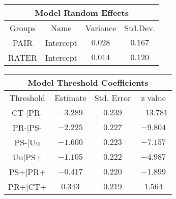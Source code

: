 \begin{minipage}{\linewidth}
\begin{tabular}{|c|c|c|c|}
\hline
\multicolumn{4}{|c|}{Model Random Effects}\\\hline
Groups  &  Name       &  Variance & Std.Dev.\\\hline
PAIR  & Intercept & $0.028$   & $0.167$  \\\hline
RATER & Intercept & $0.014$   & $0.120$ \\\hline
\end{tabular}
\end{minipage}
\newline
\newline
\newline
\begin{minipage}{\linewidth}
\begin{tabular}{|c|c|c|c|}
\hline
\multicolumn{4}{|c|}{Model Threshold Coefficients}\\\hline
Threshold &  Estimate & Std. Error & z value\\\hline
CT-|PR- & $-3.289$ & $0.239$ & $-13.781$\\\hline
PR-|PS- & $-2.225$ & $0.227$ & $ -9.804$\\\hline
PS-|Uu  & $-1.600$ & $0.223$ & $ -7.157$\\\hline
Uu|PS+  & $-1.105$ & $0.222$ & $ -4.987$\\\hline
PS+|PR+ & $-0.417$ & $0.220$ & $ -1.899$\\\hline
PR+|CT+ & $ 0.343$ & $0.219$ & $  1.564$\\\hline
\end{tabular}
\end{minipage}
